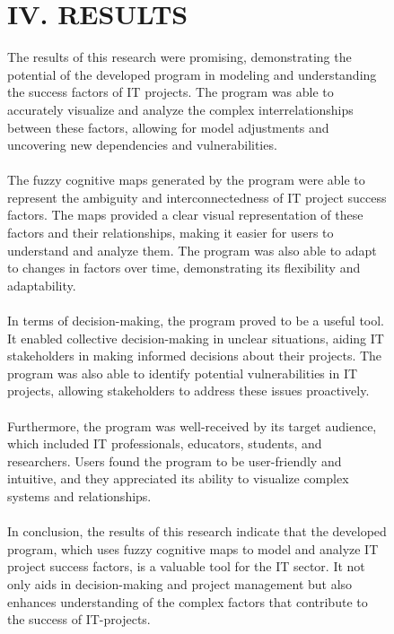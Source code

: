 \documentclass{article}
\begin{document}
\begin{figure}[!t]
\begin{minipage}{0.49\textwidth}
\begin{center}
                \chapter{IV. RESULTS}
            \end{center}
            The results of this research were promising, demonstrating the potential of the developed program in modeling and understanding the success factors of IT projects. The program was able to accurately visualize and analyze the complex interrelationships between these factors, allowing for model adjustments and uncovering new dependencies and vulnerabilities.\\
            ~\\
            The fuzzy cognitive maps generated by the program were able to represent the ambiguity and interconnectedness of IT project success factors. The maps provided a clear visual representation of these factors and their relationships, making it easier for users to understand and analyze them. The program was also able to adapt to changes in factors over time, demonstrating its flexibility and adaptability.\\
            ~\\
            In terms of decision-making, the program proved to be a useful tool. It enabled collective decision-making in unclear situations, aiding IT stakeholders in making informed decisions about their projects. The program was also able to identify potential vulnerabilities in IT projects, allowing stakeholders to address these issues proactively.\\
            ~\\
            Furthermore, the program was well-received by its target audience, which included IT professionals, educators, students, and researchers. Users found the program to be user-friendly and intuitive, and they appreciated its ability to visualize complex systems and relationships.\\
            ~\\
            In conclusion, the results of this research indicate that the developed program, which uses fuzzy cognitive maps to model and analyze IT project success factors, is a valuable tool for the IT sector. It not only aids in decision-making and project management but also enhances understanding of the complex factors that contribute to the success of IT-projects.\\
            ~\\
            \begin{center}

\end{center}
\end{minipage}
\end{figure}
\end{document}

